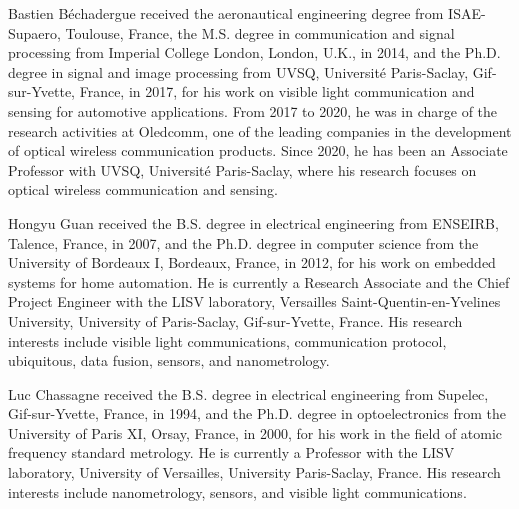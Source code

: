 \documentclass[journal]{IEEEtran}
\begin{document}
\begin{IEEEbiographynophoto}{Bastien Béchadergue}
received the aeronautical engineering degree from ISAE-Supaero, Toulouse, France, the M.S. degree in communication and signal processing from Imperial College London, London, U.K., in 2014, and the Ph.D. degree in signal and image processing from UVSQ, Université Paris-Saclay, Gif-sur-Yvette, France, in 2017, for his work on visible light communication and sensing for automotive applications. From 2017 to 2020, he was in charge of the research activities at Oledcomm, one of the leading companies in the development of optical wireless communication products. Since 2020, he has been an Associate Professor with UVSQ, Université Paris-Saclay, where his research focuses on optical wireless communication and sensing.
\end{IEEEbiographynophoto}

\begin{IEEEbiographynophoto}{Hongyu Guan}
received the B.S. degree in electrical engineering from ENSEIRB, Talence, France, in 2007, and the Ph.D. degree in computer science from the University of Bordeaux I, Bordeaux, France, in 2012, for his work on embedded systems for home automation. He is currently a Research Associate and the Chief Project Engineer with the LISV laboratory, Versailles Saint-Quentin-en-Yvelines University, University of Paris-Saclay, Gif-sur-Yvette, France. His research interests include visible light communications, communication protocol, ubiquitous, data fusion, sensors, and nanometrology.
\end{IEEEbiographynophoto}

\begin{IEEEbiographynophoto}{Luc Chassagne}
received the B.S. degree in electrical engineering from Supelec, Gif-sur-Yvette, France, in 1994, and the Ph.D. degree in optoelectronics from the University of Paris XI, Orsay, France, in 2000, for his work in the field of atomic frequency standard metrology. He is currently a Professor with the LISV laboratory, University of Versailles, University Paris-Saclay, France. His research interests include nanometrology, sensors, and visible light communications.
\end{IEEEbiographynophoto}
\end{document}
